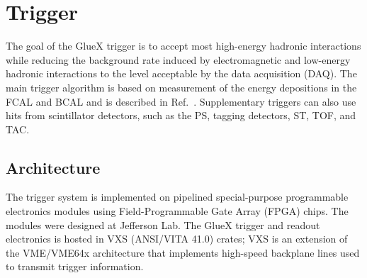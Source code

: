 
\section[Trigger]{Trigger \label{sec:trig}}
The goal of the GlueX trigger is to accept most high-energy hadronic interactions while reducing the background rate induced by electromagnetic and low-energy hadronic interactions to the level acceptable 
by the data acquisition (DAQ).  The main trigger algorithm is based on measurement of the energy depositions in the FCAL and BCAL and is described in Ref.~\cite{somov_l1,somov_l11}. Supplementary triggers can also use hits from scintillator detectors, such as the PS, tagging detectors, ST, TOF, and TAC.

\subsection{Architecture \label{sec:trigarchitecture}}
The \gx{} trigger system\cite{GlueX:2013twa} is implemented on pipelined special-purpose programmable electronics modules using Field-Programmable Gate Array (FPGA) chips. The modules were designed at Jefferson Lab.  The GlueX trigger and readout electronics is hosted in VXS (ANSI/VITA 41.0) crates; VXS is an extension of the VME/VME64x architecture that implements high-speed backplane lines used to transmit trigger information. 

